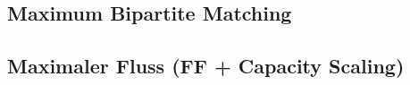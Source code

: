 %


%



%


%

%

\subsection{Maximum Bipartite Matching}


\subsection{Maximaler Fluss (FF + Capacity Scaling)}


%

